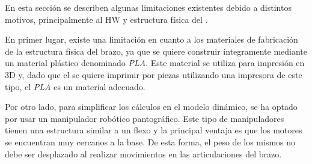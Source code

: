 En esta sección se describen  algunas limitaciones existentes debido a distintos motivos, principalmente al \ac{HW} y estructura física del \pArm{}.

En primer lugar, existe una limitación en cuanto a los materiales de fabricación de la estructura física del brazo, ya que se quiere construir íntegramente mediante un material plástico denominado \textit{PLA}. Este material se utiliza para impresión en 3D y, dado que el \pArm{} se quiere imprimir por piezas utilizando una impresora de este tipo, el \textit{PLA} es un material adecuado.

Por otro lado, para simplificar los cálculos en el modelo dinámico, se ha optado por usar un manipulador robótico pantográfico. Este tipo de manipuladores tienen una estructura similar a un flexo y la principal ventaja es que los motores se encuentran muy cercanos a la base. De esta forma, el peso de los mismos no debe ser desplazado al realizar movimientos en las articulaciones del brazo.
